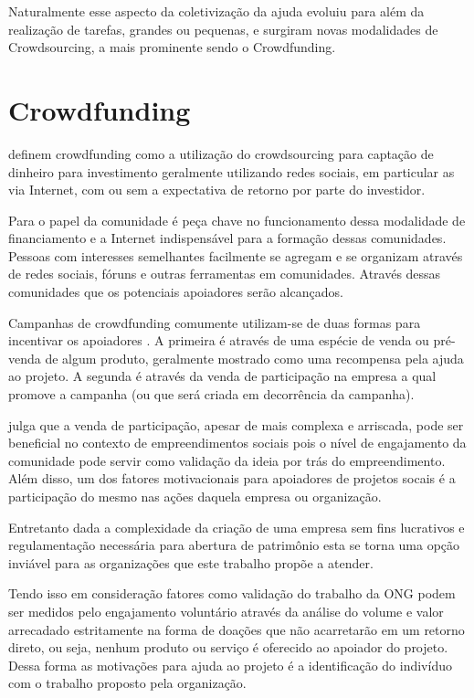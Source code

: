 Naturalmente esse aspecto da coletivização da ajuda evoluiu para além da realização de tarefas, grandes ou pequenas, e surgiram novas modalidades de Crowdsourcing, a mais prominente sendo o Crowdfunding.



\section{Crowdfunding}
\citeauthor{belleflamme2010} definem crowdfunding como a utilização do crowdsourcing para captação de dinheiro para investimento geralmente utilizando redes sociais, em particular as via Internet, com ou sem a expectativa de retorno por parte do investidor.

Para \citeauthor{golan2015crowdfunding} o papel da comunidade é peça chave no funcionamento dessa modalidade de financiamento e a Internet indispensável para a formação dessas comunidades. Pessoas com interesses semelhantes facilmente se agregam e se organizam através de redes sociais, fóruns e outras ferramentas em comunidades. Através dessas comunidades que os potenciais apoiadores serão alcançados.

Campanhas de crowdfunding comumente utilizam-se de duas formas para incentivar os apoiadores \cite{belleflamme2014crowdfunding}. A primeira é através de uma espécie de venda ou pré-venda de algum produto, geralmente mostrado como uma recompensa pela ajuda ao projeto. A segunda é através da venda de participação na empresa a qual promove a campanha (ou que será criada em decorrência da campanha).

\citeauthor{lehner2013crowdfunding} julga que a venda de participação, apesar de mais complexa e arriscada, pode ser beneficial no contexto de empreendimentos sociais pois o nível de engajamento da comunidade pode servir como validação da ideia por trás do empreendimento. Além disso, um dos fatores motivacionais para apoiadores de projetos socais é a participação do mesmo nas ações daquela empresa ou organização.

Entretanto dada a complexidade da criação de uma empresa sem fins lucrativos e regulamentação necessária para abertura de patrimônio esta se torna uma opção inviável para as organizações que este trabalho propõe a atender.

Tendo isso em consideração fatores como validação do trabalho da ONG podem ser medidos pelo engajamento voluntário através da análise do volume e valor arrecadado estritamente na forma de doações que não acarretarão em um retorno direto, ou seja, nenhum produto ou serviço é oferecido ao apoiador do projeto. Dessa forma as motivações para ajuda ao projeto é a identificação do indivíduo com o trabalho proposto pela organização.

